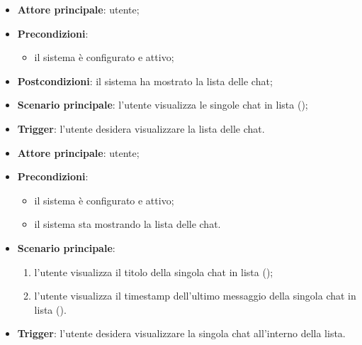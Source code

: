 \documentclass[10pt, a4paper]{article}
\begin{document}
    \begin{itemize}
        \item \textbf{Attore principale}: utente;
        \item \textbf{Precondizioni}:
        \begin{itemize}
            \item il sistema è configurato e attivo;
        \end{itemize}
        \item \textbf{Postcondizioni}: il sistema ha mostrato la lista delle chat;
        \item \textbf{Scenario principale}: l'utente visualizza le singole chat in lista ();
        \item \textbf{Trigger}: l’utente desidera visualizzare la lista delle chat.
    \end{itemize}

    \begin{itemize}
        \item \textbf{Attore principale}: utente;
        \item \textbf{Precondizioni}:
            \begin{itemize}
                \item il sistema è configurato e attivo;
                \item il sistema sta mostrando la lista delle chat.
            \end{itemize}
        \item \textbf{Scenario principale}:
        \begin{enumerate}
            \item l'utente visualizza il titolo della singola chat in lista ();
            \item l'utente visualizza il timestamp dell'ultimo messaggio della singola chat in lista ().
        \end{enumerate}
        \item \textbf{Trigger}: l’utente desidera visualizzare la singola chat all’interno della lista.
    \end{itemize}
\end{document}
